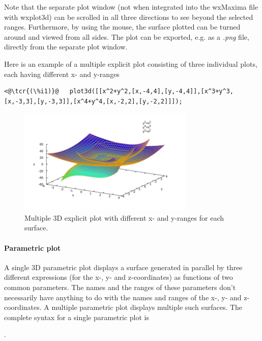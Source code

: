 \documentclass[../Maxima_Workbook.tex]{subfiles}
\begin{document}
\lz Note that the separate plot window (not when integrated into the wxMaxima file with wxplot3d) can be scrolled in all three directions to see beyond the selected ranges. Furthermore, by using the mouse, the surface plotted can be turned around and viewed from all sides. The plot can be exported, e.g. as a \emph{.png} file, directly from the separate plot window.

\lz Here is an example of a multiple explicit plot consisting of three individual plots, each having different x- and y-ranges

\lz \begin{lstlisting}
<@\tcr{(\%i1)}@   plot3d([[x^2+y^2,[x,-4,4],[y,-4,4]],[x^3+y^3,[x,-3,3],[y,-3,3]],[x^4+y^4,[x,-2,2],[y,-2,2]]]);
\end{lstlisting}
\vspace{-2mm} 

\begin{figure}
	\centering
	\includegraphics[width=0.75\textwidth]{Pl_explicit_plot3d.png}
	\caption{Multiple 3D explicit plot with different x- and y-ranges for each surface.}
	\label{Pl-Fig7}
\end{figure}

\paragraph{Parametric plot} \mbox{}

\lz A single 3D parametric plot displays a surface generated in parallel by three different expressions (for the x-, y- and z-coordinates) as functions of two common parameters. The names and the ranges of these parameters don't necessarily have anything to do with the names and ranges of the x-, y- and z-coordinates. A multiple parametric plot displays multiple such surfaces. The complete syntax for a single parametric plot is

\lz {}.
\end{document}
